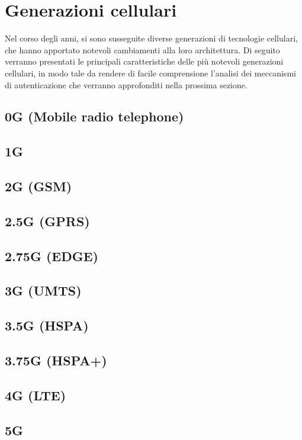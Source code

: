 \section{Generazioni cellulari}
Nel corso degli anni, si sono susseguite diverse generazioni di tecnologie cellulari, che hanno apportato
notevoli cambiamenti alla loro architettura. Di seguito verranno presentati le principali caratteristiche
delle più notevoli generazioni cellulari, in modo tale da rendere di facile comprensione l'analisi dei meccanismi
di autenticazione che verranno approfonditi nella prossima sezione.
\subsection{0G (Mobile radio telephone)}

\subsection{1G}
\subsection{2G (GSM)}
\subsection{2.5G (GPRS)}
\subsection{2.75G (EDGE)}
\subsection{3G (UMTS)}
\subsection{3.5G (HSPA)}
\subsection{3.75G (HSPA+)}
\subsection{4G (LTE)}
\subsection{5G}